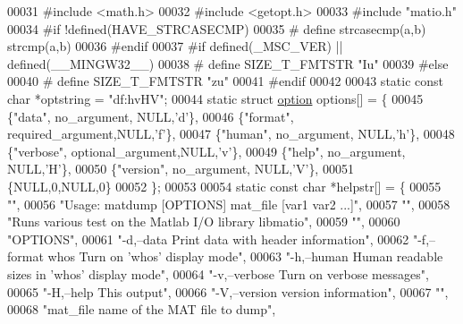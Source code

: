 \begin{DoxyCode}
00031 \textcolor{preprocessor}{#include <math.h>}
00032 \textcolor{preprocessor}{#include <getopt.h>}
00033 \textcolor{preprocessor}{#include "matio.h"}
00034 \textcolor{preprocessor}{#if !defined(HAVE\_STRCASECMP)}
00035 \textcolor{preprocessor}{#   define strcasecmp(a,b) strcmp(a,b)}
00036 \textcolor{preprocessor}{#endif}
00037 \textcolor{preprocessor}{#if defined(\_MSC\_VER) || defined(\_\_MINGW32\_\_)}
00038 \textcolor{preprocessor}{#   define SIZE\_T\_FMTSTR "Iu"}
00039 \textcolor{preprocessor}{#else}
00040 \textcolor{preprocessor}{#   define SIZE\_T\_FMTSTR "zu"}
00041 \textcolor{preprocessor}{#endif}
00042 
00043 \textcolor{keyword}{static} \textcolor{keyword}{const} \textcolor{keywordtype}{char} *optstring = \textcolor{stringliteral}{"df:hvHV"};
00044 \textcolor{keyword}{static} \textcolor{keyword}{struct }\hyperlink{structoption}{option} options[] = \{
00045     \{\textcolor{stringliteral}{"data"},    no\_argument,      NULL,\textcolor{charliteral}{'d'}\},
00046     \{\textcolor{stringliteral}{"format"},  required\_argument,NULL,\textcolor{charliteral}{'f'}\},
00047     \{\textcolor{stringliteral}{"human"},   no\_argument,      NULL,\textcolor{charliteral}{'h'}\},
00048     \{\textcolor{stringliteral}{"verbose"}, optional\_argument,NULL,\textcolor{charliteral}{'v'}\},
00049     \{\textcolor{stringliteral}{"help"},    no\_argument,      NULL,\textcolor{charliteral}{'H'}\},
00050     \{\textcolor{stringliteral}{"version"}, no\_argument,      NULL,\textcolor{charliteral}{'V'}\},
00051     \{NULL,0,NULL,0\}
00052 \};
00053 
00054 \textcolor{keyword}{static} \textcolor{keyword}{const} \textcolor{keywordtype}{char} *helpstr[] = \{
00055 \textcolor{stringliteral}{""},
00056 \textcolor{stringliteral}{"Usage: matdump [OPTIONS] mat\_file [var1 var2 ...]"},
00057 \textcolor{stringliteral}{""},
00058 \textcolor{stringliteral}{"Runs various test on the Matlab I/O library libmatio"},
00059 \textcolor{stringliteral}{""},
00060 \textcolor{stringliteral}{"OPTIONS"},
00061 \textcolor{stringliteral}{"-d,--data         Print data with header information"},
00062 \textcolor{stringliteral}{"-f,--format whos  Turn on 'whos' display mode"},
00063 \textcolor{stringliteral}{"-h,--human        Human readable sizes in 'whos' display mode"},
00064 \textcolor{stringliteral}{"-v,--verbose      Turn on verbose messages"},
00065 \textcolor{stringliteral}{"-H,--help         This output"},
00066 \textcolor{stringliteral}{"-V,--version      version information"},
00067 \textcolor{stringliteral}{""},
00068 \textcolor{stringliteral}{"mat\_file          name of the MAT file to dump"},

\end{DoxyCode}
